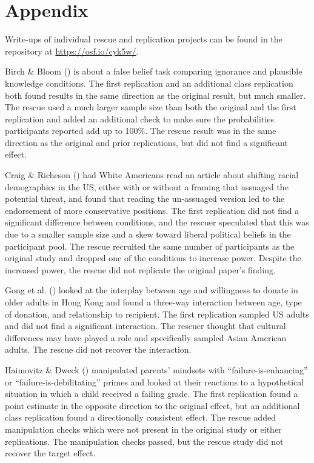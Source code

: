 \documentclass[
  english,
  a4paper,
]{article}
\begin{document}
\section*{Appendix}\label{appendix}

Write-ups of individual rescue and replication projects can be found in the repository at \url{https://osf.io/cyk5w/}.

Birch \& Bloom () is about a false belief task comparing ignorance and plausible knowledge conditions.
The first replication and an additional class replication both found results in the same direction as the original result, but much smaller.
The rescue used a much larger sample size than both the original and the first replication and added an additional check to make sure the probabilities participants reported add up to 100\%.
The rescue result was in the same direction as the original and prior replications, but did not find a significant effect.

Craig \& Richeson () had White Americans read an article about shifting racial demographics in the US, either with or without a framing that assuaged the potential threat, and found that reading the un-assuaged version led to the endorsement of more conservative positions.
The first replication did not find a significant difference between conditions, and the rescuer speculated that this was due to a smaller sample size and a skew toward liberal political beliefs in the participant pool.
The rescue recruited the same number of participants as the original study and dropped one of the conditions to increase power.
Despite the increased power, the rescue did not replicate the original paper's finding.

Gong et al. () looked at the interplay between age and willingness to donate in older adults in Hong Kong and found a three-way interaction between age, type of donation, and relationship to recipient.
The first replication sampled US adults and did not find a significant interaction.
The rescuer thought that cultural differences may have played a role and specifically sampled Asian American adults.
The rescue did not recover the interaction.

Haimovitz \& Dweck () manipulated parents' mindsets with ``failure-is-enhancing'' or ``failure-is-debilitating'' primes and looked at their reactions to a hypothetical situation in which a child received a failing grade.
The first replication found a point estimate in the opposite direction to the original effect, but an additional class replication found a directionally consistent effect.
The rescue added manipulation checks which were not present in the original study or either replications.
The manipulation checks passed, but the rescue study did not recover the target effect.
\end{document}
